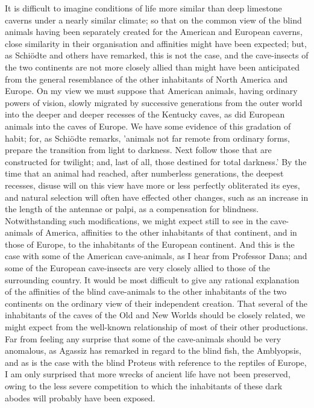 \indent It is difficult to imagine conditions of life more similar than deep limestone caverns under a nearly similar climate; so that on the common view of the blind animals having been separately created for the American and European caverns, close similarity in their organisation and affinities might have been expected; but, as Schi\"{o}dte and others have remarked, this is not the case, and the cave-insects of the two continents are not more closely allied than might have been anticipated from the general resemblance of the other inhabitants of North America and Europe. On my view we must suppose that American animals, having ordinary powers of vision, slowly migrated by successive generations from the outer world into the deeper and deeper recesses of the Kentucky caves, as did European animals into the caves of Europe. We have some evidence of this gradation of habit; for, as Schi\"{o}dte remarks, 'animals not far remote from ordinary forms, prepare the transition from light to darkness. Next follow those that are constructed for twilight; and, last of all, those destined for total darkness.' By the time that an animal had reached, after numberless generations, the deepest recesses, disuse will on this view have more or less perfectly obliterated its eyes, and natural selection will often have effected other changes, such as an increase in the length of the antennae or palpi, as a compensation for blindness. Notwithstanding such modifications, we might expect still to see in the cave-animals of America, affinities to the other inhabitants of that continent, and in those of Europe, to the inhabitants of the European continent. And this is the case with some of the American cave-animals, as I hear from Professor Dana; and some of the European cave-insects are very closely allied to those of the surrounding country. It would be most difficult to give any rational explanation of the affinities of the blind cave-animals to the other inhabitants of the two continents on the ordinary view of their independent creation. That several of the inhabitants of the caves of the Old and New Worlds should be closely related, we might expect from the well-known relationship of most of their other productions. Far from feeling any surprise that some of the cave-animals should be very anomalous, as Agassiz has remarked in regard to the blind fish, the Amblyopsis, and as is the case with the blind Proteus with reference to the reptiles of Europe, I am only surprised that more wrecks of ancient life have not been preserved, owing to the less severe competition to which the inhabitants of these dark abodes will probably have been exposed.\\


